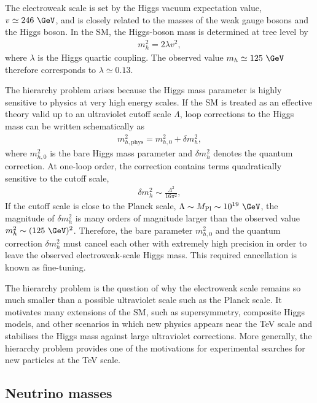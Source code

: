 The electroweak scale is set by the Higgs vacuum expectation value, $v\simeq246~\GeV$, and is closely related to the masses of the weak gauge bosons and the Higgs boson. 
In the SM, the Higgs-boson mass is determined at tree level by
\begin{align}
    m_{h}^{2}
    =
    2\lambda v^{2},
    \label{eq:higgs_mass_lambda}
\end{align}
where $\lambda$ is the Higgs quartic coupling. 
The observed value $m_{h}\simeq125~\GeV$ therefore corresponds to $\lambda\simeq0.13$.

The hierarchy problem arises because the Higgs mass parameter is highly sensitive to physics at very high energy scales. 
If the SM is treated as an effective theory valid up to an ultraviolet cutoff scale $\Lambda$, loop corrections to the Higgs mass can be written schematically as
\begin{align}
    m_{h,\mathrm{phys}}^{2}
    =
    m_{h,0}^{2}
    +
    \delta m_{h}^{2},
    \label{eq:higgs_mass_correction}
\end{align}
where $m_{h,0}^{2}$ is the bare Higgs mass parameter and $\delta m_{h}^{2}$ denotes the quantum correction. 
At one-loop order, the correction contains terms quadratically sensitive to the cutoff scale,
\begin{align}
    \delta m_{h}^{2}
    \sim
    \frac{\Lambda^{2}}{16\pi^{2}},
    \label{eq:higgs_quadratic_correction}
\end{align}
If the cutoff scale is close to the Planck scale, $\Lambda\sim M_{\mathrm{Pl}}\sim10^{19}~\GeV$, the magnitude of $\delta m_{h}^{2}$ is many orders of magnitude larger than the observed value $m_{h}^{2}\sim(125~\GeV)^{2}$. 
Therefore, the bare parameter $m_{h,0}^{2}$ and the quantum correction $\delta m_{h}^{2}$ must cancel each other with extremely high precision in order to leave the observed electroweak-scale Higgs mass. 
This required cancellation is known as fine-tuning.

The hierarchy problem is the question of why the electroweak scale remains so much smaller than a possible ultraviolet scale such as the Planck scale. 
It motivates many extensions of the SM, such as supersymmetry, composite Higgs models, and other scenarios in which new physics appears near the TeV scale and stabilises the Higgs mass against large ultraviolet corrections. 
More generally, the hierarchy problem provides one of the motivations for experimental searches for new particles at the TeV scale. 


\subsection{Neutrino masses}
\label{subsec:neutrino_masses}

